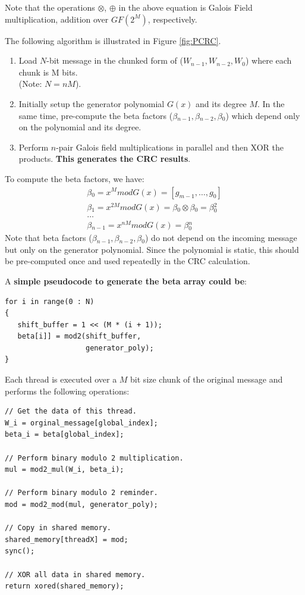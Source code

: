 \documentclass[fleqn]{IEEEtran}
\begin{document}
Note that the operations $\otimes{}$, $\oplus{}$ in the above equation is 
Galois Field multiplication, addition over $GF(2^{M})$, respectively.

The following algorithm is illustrated in Figure \ref{fig:PCRC}.
\begin{enumerate}
   \item Load $N$-bit message in the chunked form of ($W_{n-1},W_{n-2},W_{0}$)
   where each chunk is M bits. \\
   (Note: $N=nM$).

   \item Initially setup the generator polynomial $G(x)$ and its degree $M$. In
   the same time, pre-compute the beta factors 
   ($\beta{}_{n-1},\beta{}_{n-2},\beta{}_{0}$) which depend only on the 
   polynomial and its degree.

   \item Perform $n$-pair Galois field multiplications in
   parallel and then XOR the products. \textbf{This generates the CRC results}.
\end{enumerate}

To compute the beta factors, we have:
\begin{gather*}
   \beta{}_{0}=x^{M}modG(x)=[g_{m-1},\dots,g_{0}] \\
   \beta{}_{1}=x^{2M}modG(x)=\beta{}_{0}\otimes{}\beta{}_{0}=\beta{}_{0}^{2} \\
   \dots{} \\
   \beta{}_{n-1}=x^{nM}modG(x)=\beta{}_{0}^{n}
\end{gather*}
Note that beta factors ($\beta{}_{n-1},\beta{}_{n-2},\beta{}_{0}$) 
do not depend on the incoming message but only on the generator polynomial. 
Since the polynomial is static, this should be pre-computed once and used 
repeatedly in the CRC calculation.

A \textbf{simple pseudocode to generate the beta array could be}:
\begin{verbatim}
for i in range(0 : N)
{
   shift_buffer = 1 << (M * (i + 1));
   beta[i]] = mod2(shift_buffer, 
                   generator_poly);
} 
\end{verbatim}

Each thread is executed over a $M$ bit size chunk of the original message and 
performs the following operations:
\begin{verbatim}
// Get the data of this thread.
W_i = orginal_message[global_index];
beta_i = beta[global_index];

// Perform binary modulo 2 multiplication.
mul = mod2_mul(W_i, beta_i);

// Perform binary modulo 2 reminder.
mod = mod2_mod(mul, generator_poly);

// Copy in shared memory.
shared_memory[threadX] = mod;
sync();

// XOR all data in shared memory.
return xored(shared_memory);
\end{verbatim}
\end{document}
